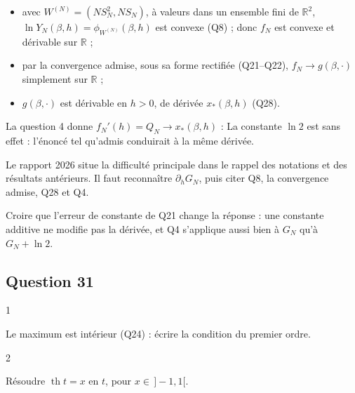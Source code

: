 \documentclass[11pt,a4paper]{article}
\providecommand{\tightlist}{\setlength{\itemsep}{0pt}\setlength{\parskip}{0pt}}
\newcommand{\equationajustee}[1]{%
  \sbox{\boiteequation}{$\displaystyle #1$}%
  \ifdim\wd\boiteequation>\linewidth
    \[\resizebox{\linewidth}{!}{\usebox{\boiteequation}}\]%
  \else
    \[#1\]%
  \fi}
\begin{document}
\begin{itemize}
\tightlist
\item
  avec \(W^{(N)}=(NS_N^2,NS_N)\), à valeurs dans un ensemble fini de \(\mathbb R^2\), \(\ln Y_N(\beta,h)=\phi_{W^{(N)}}(\beta,h)\) est convexe (Q8) ; donc \(f_N\) est convexe et dérivable sur \(\mathbb R\) ;
\item
  par la convergence admise, sous sa forme rectifiée (Q21--Q22), \(f_N\to g(\beta,\cdot)\) simplement sur \(\mathbb R\) ;
\item
  \(g(\beta,\cdot)\) est dérivable en \(h>0\), de dérivée \(x_*(\beta,h)\) (Q28).
\end{itemize}

La question 4 donne \(f_N'(h)=Q_N\to x_*(\beta,h)\) :
\equationajustee{\boxed{\lim_{N\to+\infty}\frac1{Y_N(\beta,h)}E\Big[\Big(\frac1N\sum_{i=1}^N\sigma_i\Big)\exp\Big(\frac\beta N\sum_{i,j}\sigma_i\sigma_j+h\sum_i\sigma_i\Big)\Big]=x_*(\beta,h)}}
La constante \(\ln2\) est sans effet : l'énoncé tel qu'admis conduirait à la même dérivée.

\begin{jury}

Le rapport 2026 situe la difficulté principale dans le rappel des notations et des résultats antérieurs. Il faut reconnaître \(\partial_hG_N\), puis citer Q8, la convergence admise, Q28 et Q4.

\end{jury}

\begin{piege}

Croire que l'erreur de constante de Q21 change la réponse : une constante additive ne modifie pas la dérivée, et Q4 s'applique aussi bien à \(G_N\) qu'à \(G_N+\ln2\).

\end{piege}

\hypertarget{question-31}{%
\subsection{Question 31}\label{question-31}}

\begin{indication}{1}

Le maximum est intérieur (Q24) : écrire la condition du premier ordre.

\end{indication}

\begin{indication}{2}

Résoudre \(\operatorname{th}t=x\) en \(t\), pour \(x\in\,]-1,1[\).

\end{indication}
\end{document}
